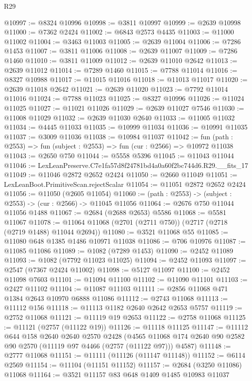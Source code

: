 \begin{lexlean}{R29}
\begin{coremodule}
@10997 := @8324 @10996
@10998 := @3811 @10997
@10999 := @2639 @10998
@11000 := @7362 @2424
@11002 := @6843 @2573 @4435
@11003 := @11000 @11002
@11004 := @3463 @11003
@11005 := @2639 @11004
@11006 := @7286 @1453
@11007 := @3811 @11006
@11008 := @2639 @11007
@11009 := @7286 @1460
@11010 := @3811 @11009
@11012 := @2639 @11010 @2642
@11013 := @2639 @11012
@11014 := @7289 @1460
@11015 := @7788 @11014
@11016 := @8327 @10988
@11017 := @11015 @11016
@11018 := @11013 @11017
@11020 := @2639 @11018 @2642
@11021 := @2639 @11020
@11023 := @7792 @11014 @11016
@11024 := @7788 @11023
@11025 := @8327 @10996
@11026 := @11024 @11025
@11027 := @11021 @11026
@11029 := @2639 @11027 @7546
@11030 := @11008 @11029
@11032 := @2639 @11030 @2640
@11033 := @11005 @11032
@11034 := @4445 @11033
@11035 := @10999 @11034
@11036 := @10991 @11035
@11037 := @3009 @11036
@11038 := @10984 @11037
@11042 := fun (path : @2553) => fun (subject : @2553) => fun (cur : @2566) => @10972 @11038
@11043 := @2650 @750
@11044 := @5558 @5396
@11045 := @11043 @11044
@11046 := LexLeanPreserve.C7e1fa57d8f24781bd4a0a60f2bc744d6.R29.__fits_17
@11049 := @11046 @2872 @2652 @2424
@11050 := @2660 @11049
@11051 := LexLeanBoot.PrimitiveScan.rejectScalar
@11054 := @11051 @2872 @2652 @2424
@11056 := @11050 (@2605 @11054)
@11060 := (path : @2553) -> (subject : @2553) -> (cur : @2566) -> @11045 @11056
@11064 := @2676 @750 @11044 @11056 @1488
@11067 := @2684 (@2688 @2653) @5586
@11068 := @5581 @11067
@11078 := @11064 @11068 (@2701 (@2711 @750)) (@2717 (@2718 (@2719 @1488) @11044 @2694))
@11080 := @3521 @11068 @55
@11085 := @11080 @648 @1385 @1486 @10971 @11038
@11086 := @706 @10976
@11087 := @11085 @11086
@11089 := @1082 (@7289 @1453)
@11090 := @2452 @11089
@11093 := @1082 (@7792 @11023 @11025)
@11094 := @2452 @11093
@11097 := @2547 (@7367 @2424 @11002)
@11098 := @5127 @11097
@11100 := @2452 @11098 @7603
@11101 := @11094 @11100
@11102 := @11090 @11101
@11103 := @2427 @11102
@11104 := @11087 @11103
@11111 := @2856 @11068 @471 @1384 @2643 @10970 @6888 @11086
@11112 := @2743 @11068
@11113 := @11112 @156
@11118 := @11113 @1182 @2640 @2642 @2653 @5757
@11119 := @2752 @11068
@11121 := @11119 @19 @2653
@11122 := @2758 @11068
@11125 := @11121 (@2757 (@11122 @19))
@11126 := @11118 @11125
@11147 := @11112
    @644
    @158
    @2640
    @2640
    @2570
    @2428
    (@4565 @11068 @174 @2640 @90 @2582 @90 @2570 (@11119 @97 @4466 (@2757 (@11122 @97))) @4587)
@11148 := @2777 @11068
@11151 := @11111 (@11126 (@11147 @11148))
@11152 := @6114 @2569
@11154 := @11104 (@11151 @11152)
@11157 := @2684 (@3250 @11086) @11068
@11164 := @3521 @11157 @83 @648 @1409 @1485 @10983 @11037

\end{coremodule}
\end{lexlean}
